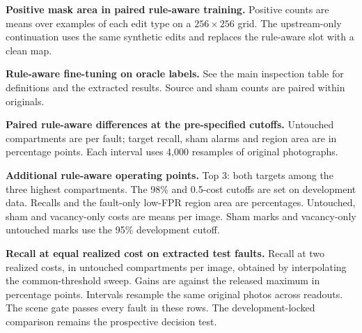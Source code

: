 \documentclass[10pt,twocolumn,letterpaper]{article}
\begin{document}
\begin{table}[t]
\centering
\caption{\textbf{Positive mask area in paired rule-aware training.} Positive counts are means over examples of each edit type on a $256{\times}256$ grid. The upstream-only continuation uses the same synthetic edits and replaces the rule-aware slot with a clean map.}
\label{tab:area_v3}
\small

\end{table}

\begin{table}[t]
\centering
\caption{\textbf{Rule-aware fine-tuning on oracle labels.} See the main inspection table for definitions and the extracted results. Source and sham counts are paired within originals.}
\label{tab:oracle_v3}
\small
\setlength{\tabcolsep}{4.5pt}

\end{table}

\begin{table}[t]
\centering
\caption{\textbf{Paired rule-aware differences at the pre-specified cutoffs.} Untouched compartments are per fault; target recall, sham alarms and region area are in percentage points. Each interval uses 4,000 resamples of original photographs.}
\label{tab:contrasts_v3}
\small

\end{table}

\begin{table}[t]
\centering
\caption{\textbf{Additional rule-aware operating points.} Top 3: both targets among the three highest compartments. The 98\% and 0.5-cost cutoffs are set on development data. Recalls and the fault-only low-FPR region area are percentages. Untouched, sham and vacancy-only costs are means per image. Sham marks and vacancy-only untouched marks use the 95\% development cutoff.}
\label{tab:operating_v3}
\scriptsize
\setlength{\tabcolsep}{3pt}

\end{table}

\begin{table}[t]
\centering
\caption{\textbf{Recall at equal realized cost on extracted test faults.} Recall at two realized costs, in untouched compartments per image, obtained by interpolating the common-threshold sweep. Gains are against the released maximum in percentage points. Intervals resample the same original photos across readouts. The scene gate passes every fault in these rows. The development-locked comparison remains the prospective decision test.}
\label{tab:exactcost}
\scriptsize
\setlength{\tabcolsep}{4pt}

\end{table}
\end{document}
